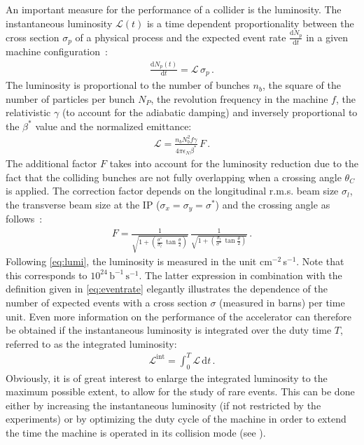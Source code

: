 An important measure for the performance of a collider is the luminosity. The instantaneous luminosity $\mathcal{L}(t)$ is a time dependent proportionality between the cross section $\sigma_p$ of a physical process and the expected event rate $\frac{\mathrm{d}N_p}{\mathrm{d}t}$ in a given machine configuration~\cite{wiedemann1999particle}:
%
\begin{align}
  \frac{\mathrm{d}N_p (t)}{\mathrm{d}t} = \mathcal{L} \, \sigma_p \, . \label{eq:eventrate}
\end{align}
%
The luminosity is proportional to the number of bunches $n_b$, the square of the number of particles per bunch $N_P$, the revolution frequency in the machine $f$, the relativistic $\gamma$ (to account for the adiabatic damping) and inversely proportional to the $\beta^*$ value and the normalized emittance:
\begin{align}
  \mathcal{L} = \frac{n_b N_b^2 f \gamma}{4 \pi \epsilon_N \beta^*} \, F \, . \label{eq:lumi}
\end{align}
%
The additional factor $F$ takes into account for the luminosity reduction due to the fact that the colliding bunches are not fully overlapping when a crossing angle $\theta_C$ is applied. The correction factor depends on the longitudinal r.m.s. beam size $\sigma_l$, the transverse beam size at the IP ($\sigma_x=\sigma_y=\sigma^*$) and the crossing angle as follows~\cite{proceedingsCAS:herr}:
%
\begin{align}
  F = \frac{1}{\sqrt{1+\left(\frac{\sigma^*}{\sigma_l} \, \tan \frac{\theta}{2} \right)}} \, \frac{1}{\sqrt{1+\left(\frac{\sigma_l}{\sigma^*} \, \tan \frac{\theta}{2} \right)}} \,.
\end{align}
%
Following \eqref{eq:lumi}, the luminosity is measured in the unit cm$^{-2}\,$s$^{-1}$. Note that this corresponds to $10^{24}\,\text{b}^{-1} \, \text{s}^{-1}$. The latter expression in combination with the definition given in \eqref{eq:eventrate} elegantly illustrates the dependence of the number of expected events with a cross section $\sigma$ (measured in barns) per time unit. Even more information on the performance of the accelerator can therefore be obtained if the instantaneous luminosity is integrated over the duty time $T$, referred to as the integrated luminosity:
%
\begin{align}
  \mathcal{L}^\text{int} = \int_{0}^T \mathcal{L} \, \mathrm{d} t \, .
\end{align} 
%
Obviously, it is of great interest to enlarge the integrated luminosity to the maximum possible extent, to allow for the study of rare events. This can be done either by increasing the instantaneous luminosity (if not restricted by the experiments) or by optimizing the duty cycle of the machine in order to extend the time the machine is operated in its collision mode (see ).

